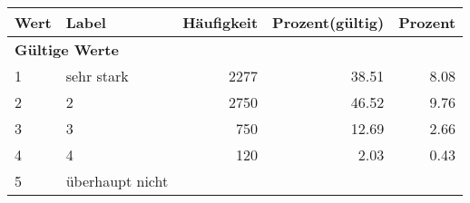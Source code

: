      \begin{longtable}{lXrrr}
     \toprule
     \textbf{Wert} & \textbf{Label} & \textbf{Häufigkeit} & \textbf{Prozent(gültig)} & \textbf{Prozent} \\
     \endhead
     \midrule
     \multicolumn{5}{l}{\textbf{Gültige Werte}}\\

     1 &
     \multicolumn{1}{X}{ sehr stark   } &


       \num{2277} &
       \num[round-mode=places,round-precision=2]{38,51} &
         \num[round-mode=places,round-precision=2]{8,08} \\

     2 &
     \multicolumn{1}{X}{ 2   } &


       \num{2750} &
       \num[round-mode=places,round-precision=2]{46,52} &
         \num[round-mode=places,round-precision=2]{9,76} \\

     3 &
     \multicolumn{1}{X}{ 3   } &


       \num{750} &
       \num[round-mode=places,round-precision=2]{12,69} &
         \num[round-mode=places,round-precision=2]{2,66} \\

     4 &
     \multicolumn{1}{X}{ 4   } &


       \num{120} &
       \num[round-mode=places,round-precision=2]{2,03} &
         \num[round-mode=places,round-precision=2]{0,43} \\

     5 &
     \multicolumn{1}{X}{ überhaupt nicht   } &



\end{longtable}
